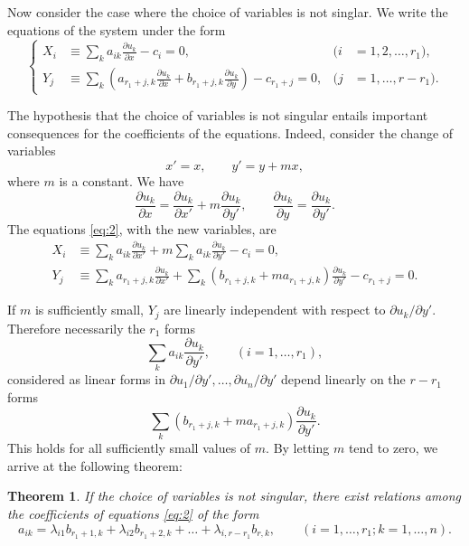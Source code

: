 \documentclass[leqno,11pt]{article}
\newcommand{\pd}{\partial}
\theoremstyle{shape1}
\newtheorem*{thm*}{\hspace{15pt}Theorem}
\theoremstyle{shape0}
\theoremstyle{shape2}
\theoremstyle{definition}
\begin{document}
Now consider the case where the choice of variables is not singlar. We write the equations of the system under the form
\begin{equation}
  \label{eq:2}
  \left\{
    \begin{aligned}
      X_{i}&\equiv\sum_{k}a_{ik}\frac{\pd u_{k}}{\pd x}-c_{i}=0,&(i&=1,2,\dots,r_{1}),\\
      Y_{j}&\equiv\sum_{k}\left(a_{r_{1}+j,k}\frac{\pd u_{k}}{\pd x}+b_{r_{1}+j,k}\frac{\pd u_{k}}{\pd y}\right)-c_{r_{1}+j}=0,&(j&=1,\dots,r-r_{1}).
    \end{aligned}
  \right.
\end{equation}

The hypothesis that the choice of variables is not singular entails important consequences for the coefficients of the equations. Indeed, consider the change of variables
\[
x'=x,\qquad y'=y+mx,
\]
where $m$ is a constant. We have
\[
\frac{\pd u_{k}}{\pd x}=\frac{\pd u_{k}}{\pd x'}+m\frac{\pd u_{k}}{\pd y'},\qquad\frac{\pd u_{k}}{\pd y}=\frac{\pd u_{k}}{\pd y'}.
\]
The equations \eqref{eq:2}, with the new variables, are
\begin{align*}
  X_{i}&\equiv \sum_{k}a_{ik}\frac{\pd u_{k}}{\pd x'}+m\sum_{k}a_{ik}\frac{\pd u_{k}}{\pd y'}-c_{i}=0,\\
  Y_{j}&\equiv\sum_{k}a_{r_{1}+j,k}\frac{\pd u_{k}}{\pd x'}+\sum_{k}(b_{r_{1}+j,k}+ma_{r_{1}+j,k})\frac{\pd u_{k}}{\pd y'}-c_{r_{1}+j}=0.
\end{align*}

If $m$ is sufficiently small, $Y_{j}$ are linearly independent with respect to $\pd u_{k}/\pd y'$. Therefore necessarily the $r_{1}$ forms
\[
\sum_{k}a_{ik}\frac{\pd u_{k}}{\pd y'},\qquad(i=1,\dots,r_{1}),
\]
considered as linear forms in $\pd u_{1}/\pd y',\dots,\pd u_{n}/\pd y'$ depend linearly on the $r-r_{1}$ forms
\[
\sum_{k}(b_{r_{1}+j,k}+ma_{r_{1}+j,k})\frac{\pd u_{k}}{\pd y'}.
\]
This holds for all sufficiently small values of $m$. By letting $m$ tend to zero, we arrive at the following theorem:

\begin{thm*}
  If the choice of variables is not singular, there exist relations among the coefficients of equations \eqref{eq:2} of the form
  \begin{equation}
    \label{eq:3}
    a_{ik}=\lambda_{i1}b_{r_{1}+1,k}+\lambda_{i2}b_{r_{1}+2,k}+\dots+\lambda_{i,r-r_{1}}b_{r,k},\qquad(i=1,\dots,r_{1};k=1,\dots,n).
  \end{equation}
\end{thm*}
\end{document}
